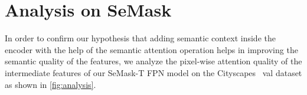 \documentclass[10pt,twocolumn,letterpaper]{article}
\newcommand{\vspaceundertab}{\vspace{-.2cm}}
\begin{document}
\begin{table}[ht!]
  \centering
  \small
  \vspaceundertab
  \caption{\textbf{Experiments with COCO-Stuff 10k.} We provide a comparison of using SeMask Swin with Semantic-FPN \cite{sem-fpn} decoder on the COCO Stuff-10k test set. We evaluate the models using both, the \textit{single scale (s.s)} and \textit{multi-scale (m.s.)} mIoU~(). 
      }
    \label{tab:coco_stuff}
\end{table} \section{Analysis on SeMask} 
\label{sec:analysis}

In order to confirm our hypothesis that adding semantic context inside the encoder with the help of the semantic attention operation helps in improving the semantic quality of the features, we analyze the pixel-wise attention quality of the intermediate features of our SeMask-T FPN model on the Cityscapes~\cite{cityscapes} val dataset as shown in \cref{fig:analysis}.
\end{document}
